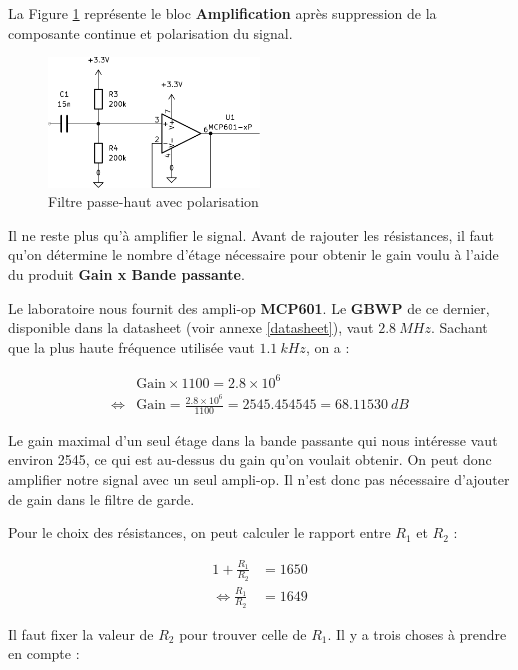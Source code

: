 La Figure \ref{fig:poldiag} représente le bloc \textbf{Amplification} après suppression de la composante continue et polarisation du signal.

\begin{figure}[H]
    \centering
    \includegraphics[width=0.5\textwidth]{pdffiles/poldiag.pdf}
    \caption{Filtre passe-haut avec polarisation}
    \label{fig:poldiag}
\end{figure}

Il ne reste plus qu'à amplifier le signal. Avant de rajouter les résistances, il faut qu'on détermine le nombre d'étage nécessaire pour obtenir le gain voulu à l'aide du produit \textbf{Gain x Bande passante}.

Le laboratoire nous fournit des ampli-op \textbf{MCP601}. Le \textbf{GBWP} de ce dernier, disponible dans la datasheet (voir annexe \ref{datasheet}), vaut $2.8 \ MHz$. Sachant que la plus haute fréquence utilisée vaut $1.1 \ kHz$, on a :

\begin{align*} 
 & \text{Gain} \times 1100 = 2.8 \times 10^{6} \\ 
\iff & \text{Gain} = \frac{2.8 \times 10^{6}}{1100}=2545.454545=68.11530 \ dB
\end{align*}

Le gain maximal d'un seul étage dans la bande passante qui nous intéresse vaut environ 2545, ce qui est au-dessus du gain  qu'on voulait obtenir. On peut donc amplifier notre signal avec un seul ampli-op. Il n'est donc pas nécessaire d'ajouter de gain dans le filtre de garde.

Pour le choix des résistances, on peut calculer le rapport entre $R_1$ et $R_2$ :

\begin{align*}
    1+ \frac{R_1}{R_2} &= 1650 \\
    \iff \frac{R_1}{R_2} &= 1649
\end{align*}

Il faut fixer la valeur de $R_2$ pour trouver celle de $R_1$. Il y a trois choses à prendre en compte :


